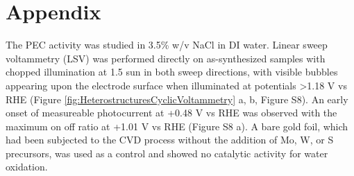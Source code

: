 \section{Appendix}

The PEC activity was studied in 3.5\% w/v NaCl in DI water. Linear sweep voltammetry (LSV) was performed directly on as-synthesized samples with chopped illumination at 1.5 sun in both sweep directions, with visible bubbles appearing upon the electrode surface when illuminated at potentials >1.18 V vs RHE (Figure \ref{fig:HeterostructuresCyclicVoltammetry} a, b, Figure S8). An early onset of measureable photocurrent at +0.48 V vs RHE was observed with the maximum on off ratio at +1.01 V vs RHE (Figure S8 a). A bare gold foil, which had been subjected to the CVD process without the addition of Mo, W, or S precursors, was used as a control and showed no catalytic activity for water oxidation. 


